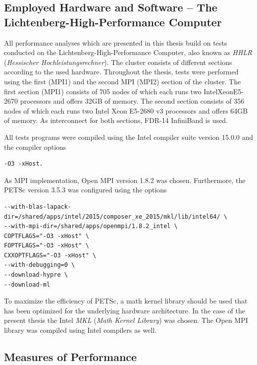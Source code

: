 \subsection{Employed Hardware and Software -- The Lichtenberg-High-Performance Computer }
\label{sec:hhlr}

All performance analyses which are presented in this thesis build on tests conducted on the Lichtenberg-High-Performance Computer, also known as \emph{HHLR} (\emph{Hessischer Hochleistungsrechner}). The cluster consists of different sections according to the used hardware. Throughout the thesis, tests were performed using the first (MPI1) and the second MPI (MPI2) section of the cluster. The first section (MPI1) consists of 705 nodes of which each runs two Intel\textregistered Xeon\textregistered E5-2670 processors and offers 32GB of memory. The second section consists of 356 nodes of which each runs two Intel Xeon E5-2680 v3 processors and offers 64GB of memory. As interconnect for both sections, FDR-14 InfiniBand is used.

All tests programs were compiled using the Intel compiler suite version 15.0.0 and the compiler options
\begin{lstlisting}
-O3 -xHost.
\end{lstlisting}
As MPI implementation, Open MPI version 1.8.2 was chosen. Furthermore, the PETSc version 3.5.3 was configured using the options
\begin{lstlisting}
--with-blas-lapack-dir=/shared/apps/intel/2015/composer_xe_2015/mkl/lib/intel64/ \
--with-mpi-dir=/shared/apps/openmpi/1.8.2_intel \
COPTFLAGS="-O3 -xHost" \
FOPTFLAGS="-O3 -xHost" \
CXXOPTFLAGS="-O3 -xHost" \
--with-debugging=0 \
--download-hypre \
--download-ml
\end{lstlisting}
To maximize the efficiency of PETSc, a math kernel library should be used that has been optimized for the underlying hardware architecture. In the case of the present thesis the Intel \emph{MKL} (\emph{Math Kernel Library}) was chosen. The Open MPI library was compiled using Intel compilers as well.

\subsection{Measures of Performance}

